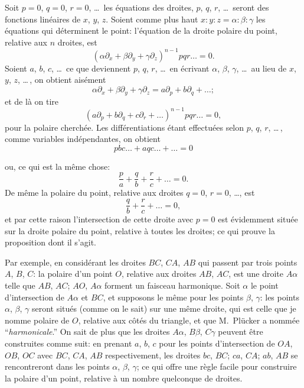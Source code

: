\documentclass[11pt]{article}
\begin{document}
\medskip
Soit $p = 0$, $q = 0$, $r = 0$, \ldots\ les \'equations des droites, $p$, $q$, $r$, \ldots\ seront des fonctions
lin\'eaires de $x$, $y$, $z$. Soient comme plus haut $x : y : z = \alpha : \beta : \gamma$ les \'equations qui
d\'eterminent le point: l'\'equation de la droite polaire du point, relative aux $n$ droites,
est
\[
(\alpha \partial_{x} + \beta \partial_{y} + \gamma \partial_{z})^{n-1} p q r \ldots = 0.
\]
Soient $a$, $b$, $c$, \ldots\ ce que deviennent $p$, $q$, $r$, \ldots\ en \'ecrivant $\alpha$, $\beta$, $\gamma$, \ldots\ au lieu de $x$, $y$, $z$, \ldots\,,
on obtient ais\'ement
\[
\alpha \partial_{x} + \beta \partial_{y} + \gamma \partial_{z} = a \partial_{p} + b \partial_{q} + \ldots ;
\]
et de l\`a on tire
\[
(a \partial_{p} + b \partial_{q} + c \partial_{r} + \ldots)^{n-1} p q r \ldots = 0,
\]
pour la polaire cherch\'ee. Les diff\'erentiations \'etant effectu\'ees selon $p$, $q$, $r$, \ldots\,, comme
variables ind\'ependantes, on obtient
\[
p b c \ldots + a q c \ldots + \ldots = 0
\]

\bigskip

\noindent ou, ce qui est la m\^eme chose:
\[
\frac{p}{a} + \frac{q}{b} + \frac{r}{c} + \ldots = 0.
\]
De m\^eme la polaire du point, relative aux droites $q = 0$, $r = 0$, \ldots, est
\[
\frac{q}{b} + \frac{r}{c} + \ldots = 0,
\]
et par cette raison l'intersection de cette droite avec $p = 0$ est \'evidemment situ\'ee sur
la droite polaire du point, relative \`a toutes les droites; ce qui prouve la proposition
dont il s'agit.

\medskip
Par exemple, en consid\'erant les droites $BC$, $CA$, $AB$ qui passent par trois points
$A$, $B$, $C$: la polaire d'un point $O$, relative aux droites $AB$, $AC$, est une droite $A\alpha$ telle
que $AB$, $AC$; $AO$, $A\alpha$ forment un faisceau harmonique. Soit $\alpha$ le point d'intersection de
$A\alpha$ et $BC$, et supposons le m\^eme pour les points $\beta$, $\gamma$: les points $\alpha$, $\beta$, $\gamma$ seront situ\'es
(comme on le sait) sur une m\^eme droite, qui est celle que je nomme polaire de $O$,
relative aux c\^ot\'es du triangle, et que M.~Pl\"ucker a nomm\'ee ``\emph{harmonicale}.'' On sait de
plus que les droites $A\alpha$, $B\beta$, $C\gamma$ peuvent \^etre construites comme suit: en prenant
$a$, $b$, $c$ pour les points d'intersection de $OA$, $OB$, $OC$ avec $BC$, $CA$, $AB$ respectivement,
les droites $bc$, $BC$; $ca$, $CA$; $ab$, $AB$ se rencontreront dans les points $\alpha$, $\beta$, $\gamma$; ce qui
offre une r\`egle facile pour construire la polaire d'un point, relative \`a un nombre quel\-conque
de droites.
\end{document}

